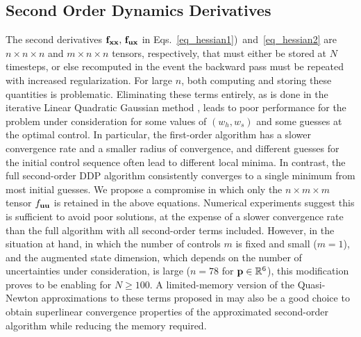 
\subsection{Second Order Dynamics Derivatives}\label{Sec:DDP_Simplification}
The second derivatives $\mathbf{f}_{\mathbf{x}\mathbf{x}},\, \mathbf{f}_{\mathbf{u}\mathbf{x}}$ in Eqs.~\eqref{eq_hessian1})~and~\eqref{eq_hessian2} are $n\times n\times n$ and $m\times n\times n$ tensors, respectively, that must either be stored at $N$ timesteps, or else recomputed in the event the backward pass must be repeated with increased regularization. For large $n$, both computing and storing these quantities is problematic. Eliminating these terms entirely, as is done in the iterative Linear Quadratic Gaussian method \cite{iLQG}, leads to poor performance for the problem under consideration for some values of $(w_h,w_s)$ and some guesses at the optimal control. In particular, the first-order algorithm has a slower convergence rate and a smaller radius of convergence, and different guesses for the initial control sequence often lead to different local minima. In contrast, the full second-order DDP algorithm consistently converges to a single minimum from most initial guesses. We propose a compromise in which only the $n\times m \times m$ tensor $f_{\mathbf{u}\mathbf{u}}$ is retained in the above equations. Numerical experiments suggest this is sufficient to avoid poor solutions, at the expense of a slower convergence rate than the full algorithm with all second-order terms included. However, in the situation at hand, in which the number of controls $m$ is fixed and small ($ m=1 $), and the augmented state dimension, which depends on the number of uncertainties under consideration, is large ($n=78$ for $\mathbf{p}\in\mathbb{R}^6$), this modification proves to be enabling for $N\geq 100$. A limited-memory version of the Quasi-Newton approximations to these terms proposed in \cite{QNDDP} may also be a good choice to obtain superlinear convergence properties of the approximated second-order algorithm while reducing the memory required. 

